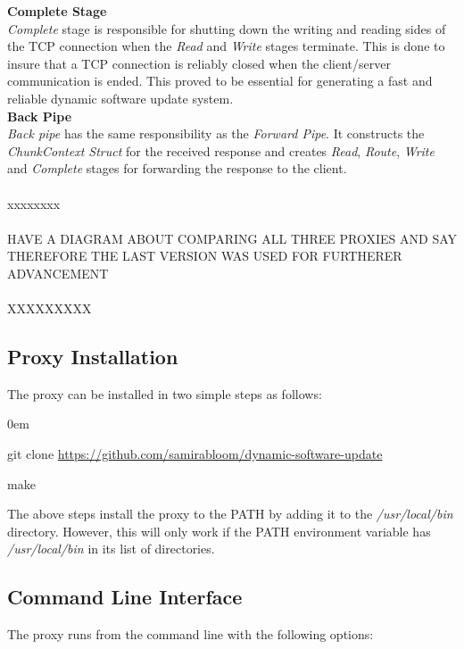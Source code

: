 \documentclass[a4paper,11pt,twoside]{article}
\begin{document}
\noindent
\textbf{Complete Stage}\\ 
\textit{Complete} stage is responsible for shutting down the writing and reading sides of the TCP connection when the \textit{Read} and \textit{Write} stages terminate. This is done to insure that a TCP connection is reliably closed when the client/server communication is ended. This proved to be essential for generating a fast and reliable dynamic software update system.\\
 
\noindent
\textbf{Back Pipe} \\
\textit{Back pipe} has the same responsibility as the \textit{Forward Pipe}. It constructs the \textit{ChunkContext Struct} for the received response and creates \textit{Read}, \textit{Route}, \textit{Write} and \textit{Complete} stages for forwarding the response to the client.\\\\

xxxxxxxx\\\\
HAVE A DIAGRAM ABOUT COMPARING ALL THREE PROXIES AND SAY THEREFORE THE LAST VERSION WAS USED FOR FURTHERER ADVANCEMENT\\\\

XXXXXXXXX\\



\subsection{Proxy Installation}
The proxy can be installed in two simple steps as follows:
\begin{list}{-}{}
  \itemsep0em
  \item git clone \url {https://github.com/samirabloom/dynamic-software-update} 
  \item make
\end{list}

\noindent
The above steps install the proxy to the PATH by adding it to the \textit{/usr/local/bin} directory. However, this will only work if the PATH environment variable has \textit{/usr/local/bin} in its list of directories. 

\subsection{Command Line Interface}
The proxy runs from the command line with the following options:\\
\end{document}
